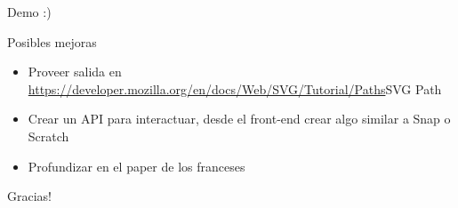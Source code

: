 \documentclass{beamer}
\begin{document}
	\begin{frame}[standout]
		Demo :)
	\end{frame}

	\begin{frame}{Posibles mejoras}
		\begin{itemize}
			\item Proveer salida en \url{https://developer.mozilla.org/en/docs/Web/SVG/Tutorial/Paths}{SVG Path}
			\item Crear un API para interactuar, desde el front-end crear algo similar a Snap o Scratch
			\item Profundizar en el paper de los franceses
		\end{itemize}
	\end{frame}

	\begin{frame}[standout]
		Gracias!
	\end{frame}
\end{document}
